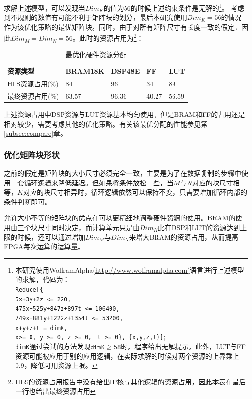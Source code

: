 求解上述模型，可以发现当\(\mathit{Dim_K}\)的值为56的时候上述约束条件是无解的\footnote{本研究使用WolframAlpha\url{(http://www.wolframalpha.com)}语言进行上述模型的求解，代码为：\\
\texttt{Reduce[\{}\\
\texttt{5x+3y+2z <= 220,}\\
\texttt{475x+525y+847z+897t <= 106400,} \\
\texttt{749x+881y+1222z+1354t <= 53200,} \\
\texttt{x+y+z+t = dimK,} \\
\texttt{x>= 0, y >= 0, z >= 0， t >= 0\}, \{x,y,z,t\}]};\\
\texttt{dimK}通过尝试的方法发现\(\mathtt{dimK \geq 58}\)时，程序给出无解提示。此外，LUT与FF资源可能被应用于别的应用逻辑，在实际求解的时候对两个资源的上界乘上0.9，降低可用资源上限。
	}。
考虑到不规则的数值有可能不利于矩阵块的划分，最后本研究使用\(\mathit{Dim_K}=56\)的情况作为该优化策略的最优矩阵块。同时，由于对所有矩阵尺寸有长度一致的假定，因此\(\mathit{Dim_M=Dim_N=56}\)。此时的资源占用为\footnote{HLS的资源占用报告中没有给出IP核与其他逻辑的资源占用，因此本表在最后一行也给出最终资源占用}：
\begin{table}[!ht]
	\centering
	\begin{tabular}{|l|l|l|l|l|}
		\hline
		资源类型 & BRAM18K  & DSP48E & FF & LUT \\ \hline
		HLS资源占用(\%) & 84 & 96 & 34 & 89 \\ \hline
		最终资源占用(\%) & 63.57 & 96.36 & 40.27 & 56.59 \\ \hline
	\end{tabular}
	
	\caption{最优化硬件资源分配}
	\label{table:gemmresopt}
\end{table}

上述资源占用中DSP资源与LUT资源基本均匀使用，但是BRAM和FF的占用还是相对较少，需要考虑其他的优化策略。有关该最优分配的性能参见第\ref{subsec:compare}章。

\subsubsection{优化矩阵块形状}\label{subsubsec:matshape}
之前的假定是矩阵块的大小尺寸必须完全一致，主要是为了在数据复制的步骤中使用一套循环逻辑来降低延迟。但如果将条件放松一些，当$M$与$N$对应的块尺寸相等，$K$对应的块尺寸相异时，循环逻辑依然可以保持不变，只需要增加循环内部的条件判断即可。

允许大小不等的矩阵块的优点在可以更精细地调整硬件资源的使用。BRAM的使用由三个块尺寸同时决定，而计算单元只是由$Dim_K$此在DSP和LUT的资源达到上限的时候，还可以通过增加$Dim_M$与$Dim_N$来增大BRAM的资源占用，从而提高FPGA每次运算的运算量。

